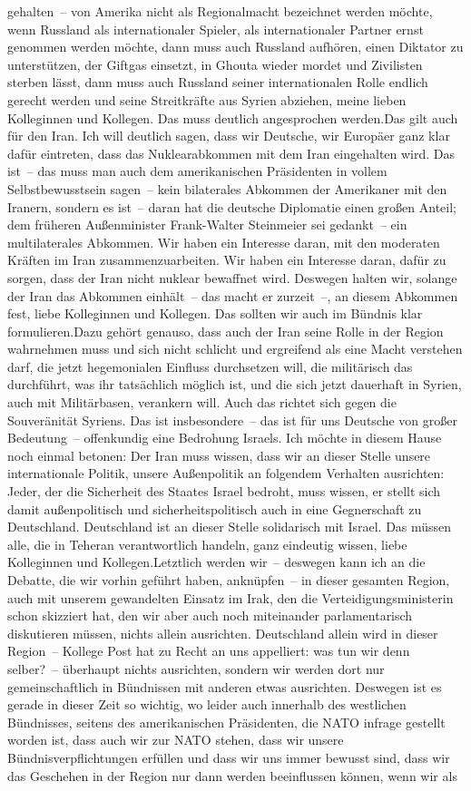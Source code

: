 \documentclass{article}
\begin{document}
gehalten – von Amerika nicht als Regionalmacht bezeichnet werden möchte, wenn Russland als internationaler Spieler, als internationaler Partner ernst genommen werden möchte, dann muss auch Russland aufhören, einen Diktator zu unterstützen, der Giftgas einsetzt, in Ghouta wieder mordet und Zivilisten sterben lässt, dann muss auch Russland seiner internationalen Rolle endlich gerecht werden und seine Streitkräfte aus Syrien abziehen, meine lieben Kolleginnen und Kollegen. Das muss deutlich angesprochen werden.Das gilt auch für den Iran. Ich will deutlich sagen, dass wir Deutsche, wir Europäer ganz klar dafür eintreten, dass das Nuklearabkommen mit dem Iran eingehalten wird. Das ist – das muss man auch dem amerikanischen Präsidenten in vollem Selbstbewusstsein sagen – kein bilaterales Abkommen der Amerikaner mit den Iranern, sondern es ist – daran hat die deutsche Diplomatie einen großen Anteil; dem früheren Außenminister Frank-Walter Steinmeier sei gedankt – ein multilaterales Abkommen. Wir haben ein Interesse daran, mit den moderaten Kräften im Iran zusammenzuarbeiten. Wir haben ein Interesse daran, dafür zu sorgen, dass der Iran nicht nuklear bewaffnet wird. Deswegen halten wir, solange der Iran das Abkommen einhält – das macht er zurzeit –, an diesem Abkommen fest, liebe Kolleginnen und Kollegen. Das sollten wir auch im Bündnis klar formulieren.Dazu gehört genauso, dass auch der Iran seine Rolle in der Region wahrnehmen muss und sich nicht schlicht und ergreifend als eine Macht verstehen darf, die jetzt hegemonialen Einfluss durchsetzen will, die militärisch das durchführt, was ihr tatsächlich möglich ist, und die sich jetzt dauerhaft in Syrien, auch mit Militärbasen, verankern will. Auch das richtet sich gegen die Souveränität Syriens. Das ist insbesondere – das ist für uns Deutsche von großer Bedeutung – offenkundig eine Bedrohung Israels. Ich möchte in diesem Hause noch einmal betonen: Der Iran muss wissen, dass wir an dieser Stelle unsere internationale Politik, unsere Außenpolitik an folgendem Verhalten ausrichten: Jeder, der die Sicherheit des Staates Israel bedroht, muss wissen, er stellt sich damit außenpolitisch und sicherheitspolitisch auch in eine Gegnerschaft zu Deutschland. Deutschland ist an dieser Stelle solidarisch mit Israel. Das müssen alle, die in Teheran verantwortlich handeln, ganz eindeutig wissen, liebe Kolleginnen und Kollegen.Letztlich werden wir – deswegen kann ich an die Debatte, die wir vorhin geführt haben, anknüpfen – in dieser gesamten Region, auch mit unserem gewandelten Einsatz im Irak, den die Verteidigungsministerin schon skizziert hat, den wir aber auch noch miteinander parlamentarisch diskutieren müssen, nichts allein ausrichten. Deutschland allein wird in dieser Region – Kollege Post hat zu Recht an uns appelliert: was tun wir denn selber? – überhaupt nichts ausrichten, sondern wir werden dort nur gemeinschaftlich in Bündnissen mit anderen etwas ausrichten. Deswegen ist es gerade in dieser Zeit so wichtig, wo leider auch innerhalb des westlichen Bündnisses, seitens des amerikanischen Präsidenten, die NATO infrage gestellt worden ist, dass auch wir zur NATO stehen, dass wir unsere Bündnisverpflichtungen erfüllen und dass wir uns immer bewusst sind, dass wir das Geschehen in der Region nur dann werden beeinflussen können, wenn wir als 
\end{document}
